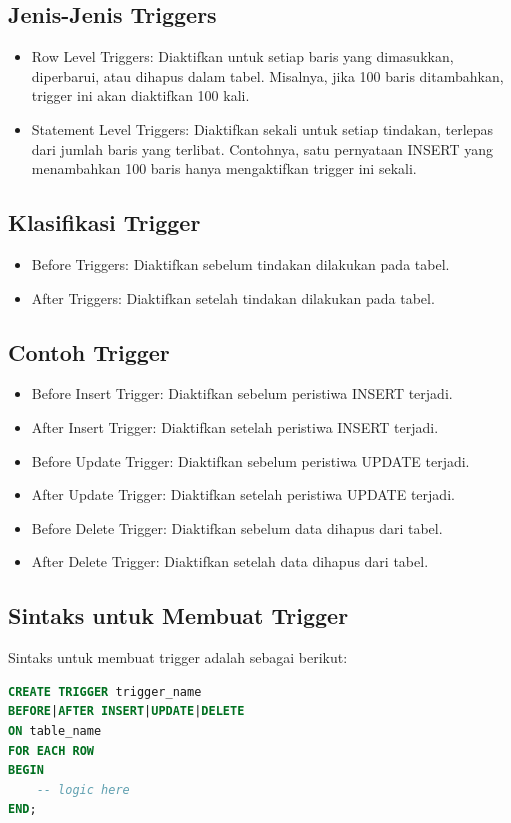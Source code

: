 \documentclass{article}
\begin{document}
\subsection{Jenis-Jenis Triggers}
\begin{itemize}
    \item Row Level Triggers: Diaktifkan untuk setiap baris yang dimasukkan, diperbarui, atau dihapus dalam tabel. Misalnya, jika 100 baris ditambahkan, trigger ini akan diaktifkan 100 kali.
    \item Statement Level Triggers: Diaktifkan sekali untuk setiap tindakan, terlepas dari jumlah baris yang terlibat. Contohnya, satu pernyataan INSERT yang menambahkan 100 baris hanya mengaktifkan trigger ini sekali.
\end{itemize}

\subsection{Klasifikasi Trigger}
\begin{itemize}
    \item Before Triggers: Diaktifkan sebelum tindakan dilakukan pada tabel.
    \item After Triggers: Diaktifkan setelah tindakan dilakukan pada tabel.
\end{itemize}

\subsection{Contoh Trigger}
\begin{itemize}
    \item Before Insert Trigger: Diaktifkan sebelum peristiwa INSERT terjadi.
    \item After Insert Trigger: Diaktifkan setelah peristiwa INSERT terjadi.
    \item Before Update Trigger: Diaktifkan sebelum peristiwa UPDATE terjadi.
    \item After Update Trigger: Diaktifkan setelah peristiwa UPDATE terjadi.
    \item Before Delete Trigger: Diaktifkan sebelum data dihapus dari tabel.
    \item After Delete Trigger: Diaktifkan setelah data dihapus dari tabel.
\end{itemize}

\subsection{Sintaks untuk Membuat Trigger}
Sintaks untuk membuat trigger adalah sebagai berikut:
\begin{lstlisting}[language=SQL, caption={}, captionpos=b]
CREATE TRIGGER trigger_name
BEFORE|AFTER INSERT|UPDATE|DELETE
ON table_name
FOR EACH ROW
BEGIN
    -- logic here
END;
\end{lstlisting}
\end{document}
